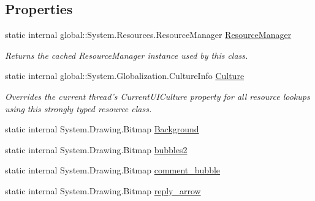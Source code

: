 \subsection*{\-Properties}
\begin{DoxyCompactItemize}
\item 
static internal \*
global\-::\-System.\-Resources.\-Resource\-Manager \hyperlink{class_sr_p___classroom_inq_1_1_properties_1_1_resources_a7809b92866e9561f253e4829dc02560f}{\-Resource\-Manager}
\begin{DoxyCompactList}\small\item\em \-Returns the cached \-Resource\-Manager instance used by this class. \end{DoxyCompactList}\item 
static internal \*
global\-::\-System.\-Globalization.\-Culture\-Info \hyperlink{class_sr_p___classroom_inq_1_1_properties_1_1_resources_a1788010aa2d65a3c3244ec2f6ccd20ed}{\-Culture}
\begin{DoxyCompactList}\small\item\em \-Overrides the current thread's \-Current\-U\-I\-Culture property for all resource lookups using this strongly typed resource class. \end{DoxyCompactList}\item 
static internal \*
\-System.\-Drawing.\-Bitmap \hyperlink{class_sr_p___classroom_inq_1_1_properties_1_1_resources_a16ac92929f55281abad59488efae062b}{\-Background}
\item 
static internal \*
\-System.\-Drawing.\-Bitmap \hyperlink{class_sr_p___classroom_inq_1_1_properties_1_1_resources_ae15d966afaa44ab7f083fa1bb1cf1c82}{bubbles2}
\item 
static internal \*
\-System.\-Drawing.\-Bitmap \hyperlink{class_sr_p___classroom_inq_1_1_properties_1_1_resources_a2ca7de7a89e9cc488bc2e7ca92f49c94}{comment\-\_\-bubble}
\item 
static internal \*
\-System.\-Drawing.\-Bitmap \hyperlink{class_sr_p___classroom_inq_1_1_properties_1_1_resources_ab0a3e726876b922e1691be1f3853b481}{reply\-\_\-arrow}

\end{DoxyCompactItemize}
